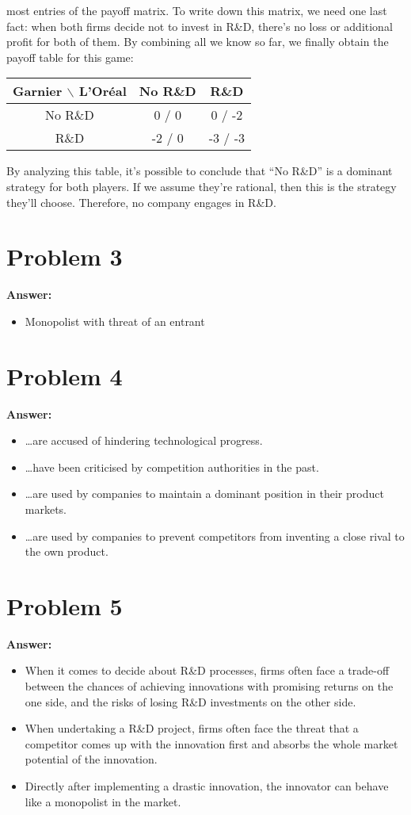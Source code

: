 \documentclass[11pt]{article}
\begin{document}
most entries of the payoff matrix. To write down this matrix, we need one
last fact: when both firms decide not to invest in R\&D, there's no loss or
additional profit for both of them. By combining all we know so far, we
finally obtain the payoff table for this game:
\begin{center}
\begin{tabular}{|c|c|c|}
\hline
Garnier $\backslash$ L'Oréal & No R\&D & R\&D\\
\hline
No R\&D & 0 / 0 & 0 / -2\\
R\&D & -2 / 0 & -3 / -3\\
\hline
\end{tabular}
\end{center}
By analyzing this table, it's possible to conclude that ``No R\&D'' is a
dominant strategy for both players. If we assume they're rational, then
this is the strategy they'll choose. Therefore, no company engages in R\&D.
\section*{Problem 3}
\label{sec:org034e1ef}

\textbf{Answer:}
\begin{itemize}
\item Monopolist with threat of an entrant
\end{itemize}
\section*{Problem 4}
\label{sec:orgf804de7}

\textbf{Answer:}
\begin{itemize}
\item \ldots{}are accused of hindering technological progress.
\item \ldots{}have been criticised by competition authorities in the past.
\item \ldots{}are used by companies to maintain a dominant position in their product
markets.
\item \ldots{}are used by companies to prevent competitors from inventing a close
rival to the own product.
\end{itemize}
\section*{Problem 5}
\label{sec:orgfb00b5e}

\textbf{Answer:}
\begin{itemize}
\item When it comes to decide about R\&D processes, firms often face a trade-off
between the chances of achieving innovations with promising returns on
the one side, and the risks of losing R\&D investments on the other side.
\item When undertaking a R\&D project, firms often face the threat that a
competitor comes up with the innovation first and absorbs the whole
market potential of the innovation.
\item Directly after implementing a drastic innovation, the innovator can
behave like a monopolist in the market.
\end{itemize}
\end{document}
